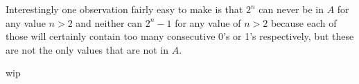 \documentclass{article}
\begin{document}
Interestingly one observation fairly easy to make is that $2^n$ can never be in $A$ for any value $n > 2$ and neither can $2^n-1$ for any value of $n > 2$ because each of those will certainly contain too many consecutive 0's or 1's respectively, but these are not the only values that are not in $A$.

\par

wip
\end{document}
